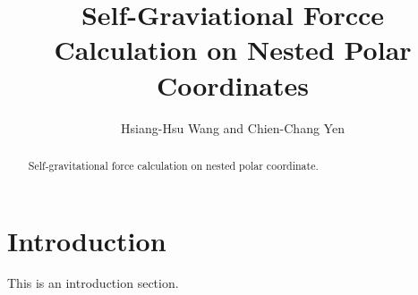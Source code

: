 \documentclass[14pt,aspectratio=169]{article}
\title{Self-Graviational Forcce Calculation on Nested Polar Coordinates}
\author{Hsiang-Hsu Wang and Chien-Chang Yen}
\begin{document}
\maketitle

\begin{abstract}
Self-gravitational force calculation on nested polar coordinate.
\end{abstract}

\section{Introduction}
This is an introduction section.
\end{document}
